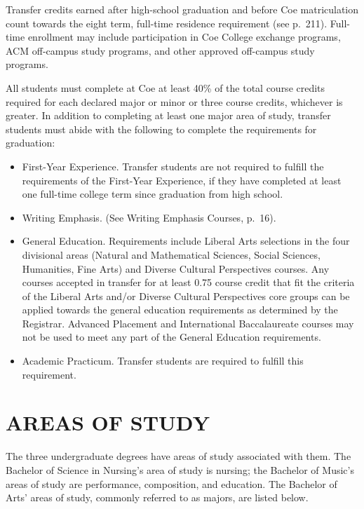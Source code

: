\documentclass[
  letterpaper,
]{scrbook}
\providecommand{\tightlist}{%
  \setlength{\itemsep}{0pt}\setlength{\parskip}{0pt}}
\begin{document}
Transfer credits earned after high-school graduation and before Coe
matriculation count towards the eight term, full-time residence
requirement (see p.~211). Full-time enrollment may include participation
in Coe College exchange programs, ACM off-campus study programs, and
other approved off-campus study programs.

All students must complete at Coe at least 40\% of the total course
credits required for each declared major or minor or three course
credits, whichever is greater. In addition to completing at least one
major area of study, transfer students must abide with the following to
complete the requirements for graduation:

\begin{itemize}
\tightlist
\item
  First-Year Experience. Transfer students are not required to fulfill
  the requirements of the First-Year Experience, if they have completed
  at least one full-time college term since graduation from high school.
\item
  Writing Emphasis. (See Writing Emphasis Courses, p.~16).
\item
  General Education. Requirements include Liberal Arts selections in the
  four divisional areas (Natural and Mathematical Sciences, Social
  Sciences, Humanities, Fine Arts) and Diverse Cultural Perspectives
  courses. Any courses accepted in transfer for at least 0.75 course
  credit that fit the criteria of the Liberal Arts and/or Diverse
  Cultural Perspectives core groups can be applied towards the general
  education requirements as determined by the Registrar. Advanced
  Placement and International Baccalaureate courses may not be used to
  meet any part of the General Education requirements.
\item
  Academic Practicum. Transfer students are required to fulfill this
  requirement.
\end{itemize}

\chapter{AREAS OF STUDY}\label{sec-areas-of-study}

The three undergraduate degrees have areas of study associated with
them. The Bachelor of Science in Nursing's area of study is nursing; the
Bachelor of Music's areas of study are performance, composition, and
education. The Bachelor of Arts' areas of study, commonly referred to as
majors, are listed below.
\end{document}
